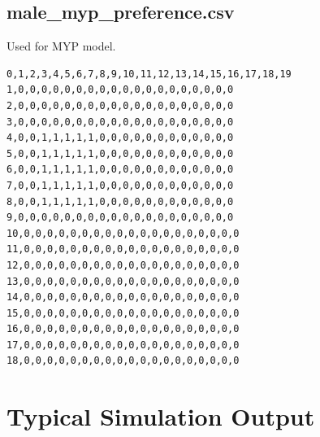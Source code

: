 \documentclass[authoryearcitations]{UoYCSproject}
\begin{document}
\section{male\_myp\_preference.csv}
Used for MYP model.
\begin{framed}
\begin{verbatim}
0,1,2,3,4,5,6,7,8,9,10,11,12,13,14,15,16,17,18,19
1,0,0,0,0,0,0,0,0,0,0,0,0,0,0,0,0,0,0,0
2,0,0,0,0,0,0,0,0,0,0,0,0,0,0,0,0,0,0,0
3,0,0,0,0,0,0,0,0,0,0,0,0,0,0,0,0,0,0,0
4,0,0,1,1,1,1,1,0,0,0,0,0,0,0,0,0,0,0,0
5,0,0,1,1,1,1,1,0,0,0,0,0,0,0,0,0,0,0,0
6,0,0,1,1,1,1,1,0,0,0,0,0,0,0,0,0,0,0,0
7,0,0,1,1,1,1,1,0,0,0,0,0,0,0,0,0,0,0,0
8,0,0,1,1,1,1,1,0,0,0,0,0,0,0,0,0,0,0,0
9,0,0,0,0,0,0,0,0,0,0,0,0,0,0,0,0,0,0,0
10,0,0,0,0,0,0,0,0,0,0,0,0,0,0,0,0,0,0,0
11,0,0,0,0,0,0,0,0,0,0,0,0,0,0,0,0,0,0,0
12,0,0,0,0,0,0,0,0,0,0,0,0,0,0,0,0,0,0,0
13,0,0,0,0,0,0,0,0,0,0,0,0,0,0,0,0,0,0,0
14,0,0,0,0,0,0,0,0,0,0,0,0,0,0,0,0,0,0,0
15,0,0,0,0,0,0,0,0,0,0,0,0,0,0,0,0,0,0,0
16,0,0,0,0,0,0,0,0,0,0,0,0,0,0,0,0,0,0,0
17,0,0,0,0,0,0,0,0,0,0,0,0,0,0,0,0,0,0,0
18,0,0,0,0,0,0,0,0,0,0,0,0,0,0,0,0,0,0,0
\end{verbatim}
\end{framed}

\chapter{Typical Simulation Output}
\label{adx:typicalSimulationOutput}
\end{document}
